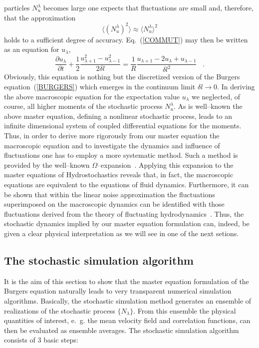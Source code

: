 particles $N_u^{\lambda}$ becomes large one expects that
fluctuations are
small and, therefore, that the approximation
\begin{equation}
\langle \left( N_u^{\lambda} \right)^2 \rangle \approx
\langle N_u^{\lambda} \rangle^2
\end{equation}
holds to a sufficient degree of accuracy.
Eq.~(\ref{COMMUT}) may then be
written as an equation for $u_{\lambda}$,
\begin{equation}
\frac{\partial u_{\lambda}}{\partial t} +
\frac{1}{2} \frac{u_{\lambda +1}^2 -
u_{\lambda -1}^2}{2\delta l} =
\frac{1}{R} \frac{u_{\lambda +1} -2u_{\lambda}
+ u_{\lambda -1}}{\delta l^2} \;\;\; .
\end{equation}
Obviously, this equation is nothing but the discretized
version of the
Burgers equation~(\ref{BURGERS}) which emerges in the continuum
limit
$\delta l \longrightarrow 0$.
In deriving the above macroscopic equation for the expectation value
$u_{\lambda}$ we neglected, of course, all higher moments of
the stochastic
process $N_u^{\lambda}$. As is well--known the above master
equation,
defining a nonlinear stochastic process, leads to an infinite
dimensional
system of coupled differential equations for the moments. Thus,
in order to
derive more rigorously from our master equation
the macroscopic equation and to investigate the
dynamics and influence of fluctuations one has to
employ a more systematic
method. Such a method is provided by the well--known
$\Omega$--expansion~\cite{KAMPEN}. Applying this
expansion to the master
equations of Hydrostochastics reveals that, in fact,
the macroscopic
equations are equivalent to the equations of fluid dynamics.
Furthermore,
it can be shown that within the linear noise approximation the
fluctuations
superimposed on the macroscopic dynamics can be identified with
those
fluctuations derived from the theory of fluctuating
hydrodynamics~\cite{LANDAU}.
Thus, the stochastic dynamics implied by our master equation
formulation
can, indeed, be given a clear physical interpretation as we will see in one of
the next setions.

\subsection{The stochastic simulation algorithm}
It is the aim of this section to show that the master equation formulation
of the Burgers equation naturally leads to very transparent numerical
simulation algorithms.
Basically, the stochastic simulation method generates an ensemble of
realizations of the stochastic process $\{ N_{\lambda} \}$.
From this ensemble
the physical quantities of interest, e.~g. the mean velocity field
and correlation functions,
can then be evaluated as ensemble averages.
The stochastic simulation algorithm consists of 3 basic steps:

